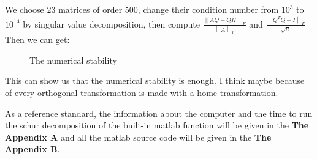 We choose 23 matrices of order 500, change their condition number from \(10^3\) to \(10^14\) by singular value decomposition, then compute \(\frac{{{{\left\| {AQ - QH} \right\|}_F}}}{{{{\left\| A \right\|}_F}}}\) and \(\frac{{{{\left\| {{Q^T}Q - I} \right\|}_F}}}{{\sqrt n }}\) Then we can get:
\begin{figure}[H]
  \centering
  \caption{The numerical stability}
\end{figure}

This can show us that the numerical stability is enough. I think maybe because of every orthogonal transformation is made with a home transformation.

As a reference standard, the information about the computer and the time to run the schur decomposition of the built-in matlab function will be given in the \textbf{The Appendix A} and all the matlab source code will be given in the \textbf{The Appendix B}.
